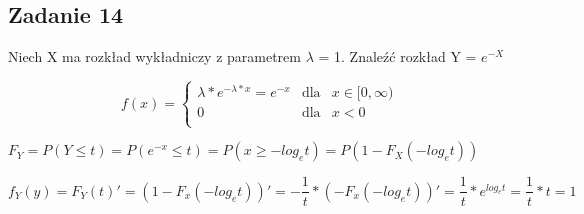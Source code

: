 \subsection{Zadanie 14}


Niech X ma rozkład wykładniczy z parametrem $\lambda$ = 1. Znaleźć rozkład Y = $e^{-X}$


$$
f(x) = \left\{
\begin{array}{rcl}
 \lambda*e^{ -\lambda*x } = e^{-x} & \text{dla} & x \in [0,\infty)\\
 0 & \text{dla} & x < 0\\
\end{array}
\right.
$$

$
F_{Y} = P(Y \leq t) = P(e^{-x} \leq t) = P(x \geq -log_{e}t) = P(1 - F_{X}(-log_{e}t))
$

$
f_{Y}(y) = F_{Y}(t)' = (1 - F_{x}(-log_{e}t))' = -\dfrac{1}{t} * (-F_{x}(-log_{e}t))' = \dfrac{1}{t} * e^{log_{e}t} = \dfrac{1}{t} * t = 1
$
